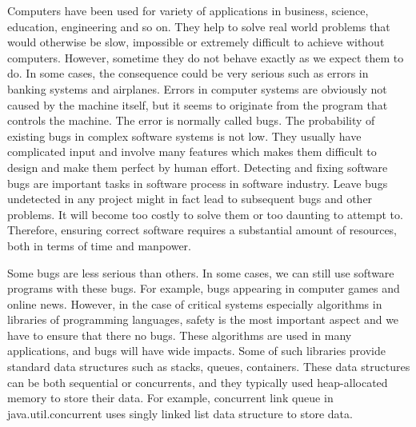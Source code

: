 \label{chapter:verification}

Computers have been used for variety of applications in business, science, education, engineering and so on. They help to solve real world problems that would otherwise be slow, impossible or extremely difficult to achieve without computers. However, sometime they do not behave exactly as we expect them to do. In some cases, the consequence could be very serious such as errors in banking systems and airplanes. Errors in computer systems are obviously not caused by the machine itself, but it seems to originate from the program that controls the machine. The error is normally called bugs. 
%
The probability of existing bugs in complex software systems is not low. They usually have complicated input and involve many features which makes them difficult to design and make them perfect by human effort.
%
Detecting and fixing software bugs are important tasks in software process in software industry. Leave bugs undetected in any project might in fact lead to
subsequent bugs and other problems. It will
become too costly to solve them or too daunting to attempt to. Therefore, ensuring correct software requires a substantial amount of
resources, both in terms of time and manpower.

%
%
%

Some bugs are less serious than others. In some cases, we can still use software programs with these bugs. For example, bugs appearing in computer games and online news. However, in the case of critical systems 
especially algorithms in libraries of programming languages, safety is the most important aspect and we have to ensure that there no bugs. These algorithms are used in many applications, and bugs will have wide impacts. Some of such libraries provide standard data structures such as stacks, queues, containers. These data structures can be both sequential or concurrents, and they typically used heap-allocated memory to store their data. For example, concurrent link queue in java.util.concurrent uses singly linked list data structure to store data.   

